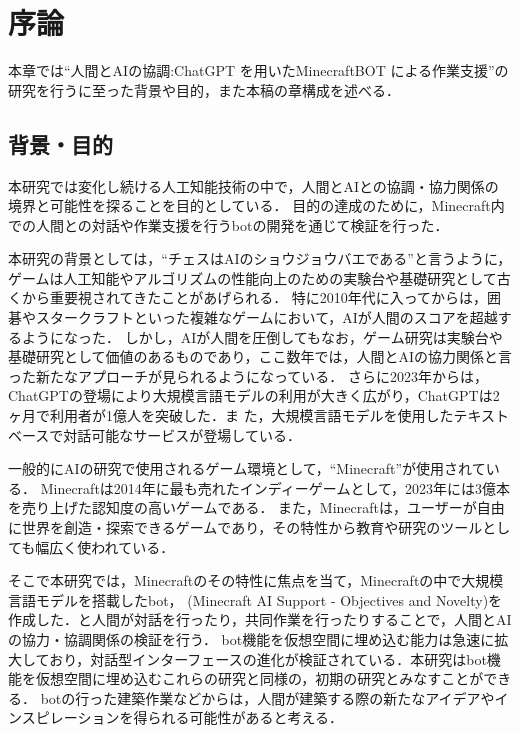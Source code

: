 \chapter{序論}	
\thispagestyle{plain}   %

本章では``人間とAIの協調:ChatGPT を用いたMinecraftBOT による作業支援''の研究を行うに至った背景や目的，また本稿の章構成を述べる．

\section{背景・目的}
本研究では変化し続ける人工知能技術の中で，人間とAIとの協調・協力関係の境界と可能性を探ることを目的としている．
目的の達成のために，Minecraft内での人間との対話や作業支援を行うbotの開発を通じて検証を行った．

本研究の背景としては，``チェスはAIのショウジョウバエである''\cite{bib:chess}と言うように，ゲームは人工知能やアルゴリズムの性能向上のための実験台や基礎研究として古くから重要視されてきたことがあげられる．
特に2010年代に入ってからは，囲碁やスタークラフトといった複雑なゲームにおいて，AIが人間のスコアを超越するようになった\cite{bib:AplpaGo,bibAlphaStar}．
しかし，AIが人間を圧倒してもなお，ゲーム研究は実験台や基礎研究として価値のあるものであり，ここ数年では，人間とAIの協力関係と言った新たなアプローチが見られるようになっている\cite{bib:maia,bib:craft_assist}．
さらに2023年からは，ChatGPT\cite{bib:chatgpt}の登場により大規模言語モデルの利用が大きく広がり，ChatGPTは2ヶ月で利用者が1億人を突破した\cite{bib:chatgpt_news}．ま
た，大規模言語モデルを使用したテキストベースで対話可能なサービスが登場している\cite{bib:citegpt, bib:slidegpt}．

一般的にAIの研究で使用されるゲーム環境として，``Minecraft\cite{bib:Minecraft}''が使用されている．
Minecraftは2014年に最も売れたインディーゲームとして，2023年には3億本を売り上げた認知度の高いゲームである\cite{bib:minecraft_news}．
また，Minecraftは，ユーザーが自由に世界を創造・探索できるゲームであり，その特性から教育や研究のツールとしても幅広く使われている．

そこで本研究では，Minecraftのその特性に焦点を当て，Minecraftの中で大規模言語モデルを搭載したbot，{\mason} (Minecraft AI Support - Objectives and Novelty)を作成した．{\mason}と人間が対話を行ったり，共同作業を行ったりすることで，人間とAIの協力・協調関係の検証を行う．
bot機能を仮想空間に埋め込む能力は急速に拡大しており，対話型インターフェースの進化が検証されている．本研究はbot機能を仮想空間に埋め込むこれらの研究と同様の，初期の研究とみなすことができる．
botの行った建築作業などからは，人間が建築する際の新たなアイデアやインスピレーションを得られる可能性があると考える．

